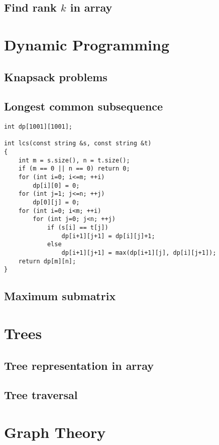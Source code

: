 \documentclass[a4paper]{article}
\begin{document}
\subsection{Find rank $k$ in array}

\section{Dynamic Programming}

\subsection{Knapsack problems}

\subsection{Longest common subsequence}
\begin{verbatim}
int dp[1001][1001];

int lcs(const string &s, const string &t)
{
	int m = s.size(), n = t.size();
	if (m == 0 || n == 0) return 0;
	for (int i=0; i<=m; ++i)
		dp[i][0] = 0;
	for (int j=1; j<=n; ++j)
		dp[0][j] = 0;
	for (int i=0; i<m; ++i)
		for (int j=0; j<n; ++j)
			if (s[i] == t[j])
        		dp[i+1][j+1] = dp[i][j]+1;
        	else
        		dp[i+1][j+1] = max(dp[i+1][j], dp[i][j+1]);
	return dp[m][n];
}
\end{verbatim}

\subsection{Maximum submatrix}

\section{Trees}

\subsection{Tree representation in array}

\subsection{Tree traversal}

\section{Graph Theory}
\end{document}
